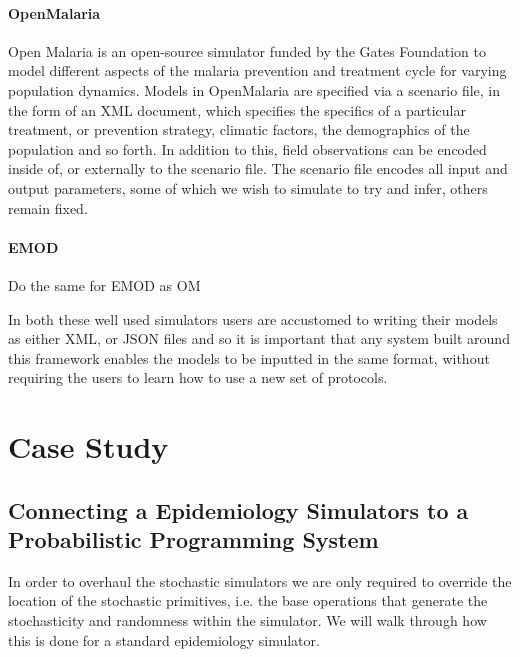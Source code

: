 \documentclass{article}
\begin{document}
 \paragraph*{OpenMalaria} 
Open Malaria is an open-source simulator funded by the Gates Foundation to model different  aspects of the malaria prevention and treatment cycle for varying population dynamics.
 Models in OpenMalaria are specified via a scenario file, in the form of an XML document, which specifies the specifics of a particular treatment, or prevention strategy, climatic factors, the demographics of the population and so forth. In addition to this, field observations can be encoded inside of, or externally to the scenario file. 
The scenario file encodes all input and output parameters, some of which we wish to simulate to try and infer, others remain fixed. 

\paragraph{EMOD} Do the same for EMOD as OM

In both these well used simulators users are accustomed to writing their models as either XML, or JSON files and so it is important that any system built around this framework enables the models to be inputted in the same format, without requiring the users to learn how to use a new set of protocols. 

\section{Case Study}
\label{sec:casestudy}
\subsection{Connecting a Epidemiology Simulators to a Probabilistic Programming System}

In order to overhaul the stochastic simulators we are only required to override the location of the stochastic primitives, i.e. the base operations that generate the stochasticity and randomness within the simulator. 
We will walk through how this is done for a standard epidemiology simulator.
\end{document}
